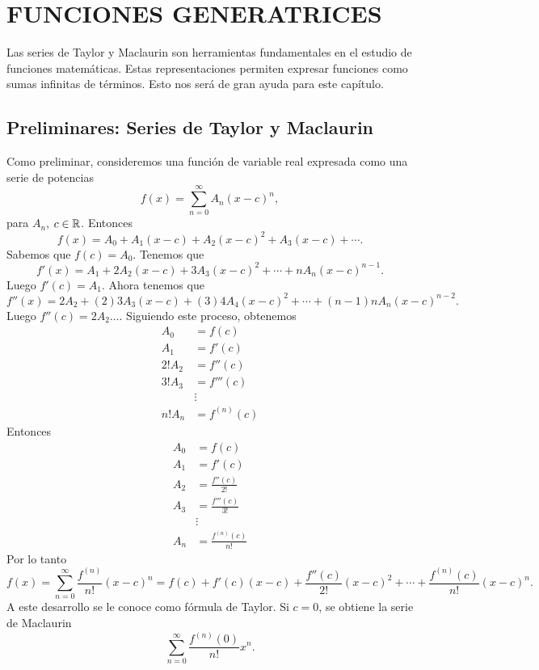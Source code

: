 \chapterspaceabove{6.75cm} %
\chapterspacebelow{7.25cm} %


\chapter{FUNCIONES GENERATRICES}

Las series de Taylor y Maclaurin son herramientas fundamentales en el estudio de funciones matemáticas. Estas representaciones permiten expresar funciones como sumas infinitas de términos. Esto nos será de gran ayuda para este capítulo.

\section{Preliminares: Series de Taylor y Maclaurin}

Como preliminar, consideremos una función de variable real expresada como una serie de potencias
$$f(x) = \sum_{n=0}^{\infty} A_n(x-c)^n,$$
para $A_n$, $c \in \RR$. Entonces
$$f(x) = A_0 + A_1(x-c) + A_2(x-c)^2 + A_3(x-c) + \cdots.$$
Sabemos que $f(c)=A_0$. Tenemos que
$$f'(x)=A_1+2A_2(x-c)+3A_3(x-c)^2+\cdots +nA_n(x-c)^{n-1}.$$
Luego $f'(c)=A_1$. Ahora tenemos que
$$f''(x)=2A_2+(2)3A_3(x-c)+(3)4A_4(x-c)^2+\cdots +(n-1)nA_n(x-c)^{n-2}.$$
Luego $f''(c)=2A_2 \dots$. Siguiendo este proceso, obtenemos
\begin{align*}
    A_0 &=f(c) \\
    A_1 &=f'(c) \\
    2!A_2 &=f''(c) \\
    3!A_3 &=f'''(c) \\
    & \vdots \\
    n!A_n &=f^{(n)}(c)
\end{align*}
Entonces
\begin{align*}
    A_0 &=f(c) \\
    A_1 &=f'(c) \\
    A_2 &=\frac{f''(c)}{2!} \\
    A_3 &=\frac{f'''(c)}{3!} \\
    & \vdots \\
    A_n &=\frac{f^{(n)}(c)}{n!}
\end{align*}
Por lo tanto
$$f(x) = \sum_{n=0}^{\infty} \frac{f^{(n)}}{n!}(x-c)^n =f(c)+f'(c)(x-c)+\frac{f''(c)}{2!}(x-c)^2+\cdots +\frac{f^{(n)}(c)}{n!}(x-c)^n.$$
A este desarrollo se le conoce como fórmula de Taylor. Si $c = 0$, se obtiene la serie de Maclaurin
$$\sum_{n=0}^{\infty} \frac{f^{(n)}(0)}{n!}x^n.$$

